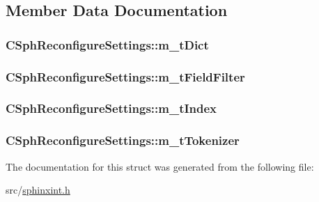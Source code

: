 \subsection{Member Data Documentation}
\hypertarget{structCSphReconfigureSettings_a40f47cd7d52afd6f313c79d8aea17ba6}{
\subsubsection[{m\-\_\-t\-Dict}]{ C\-Sph\-Reconfigure\-Settings\-::m\-\_\-t\-Dict}}\label{structCSphReconfigureSettings_a40f47cd7d52afd6f313c79d8aea17ba6}
\hypertarget{structCSphReconfigureSettings_ad9f3ec1becdaad2cc1f3a8f513bd2748}{
\subsubsection[{m\-\_\-t\-Field\-Filter}]{ C\-Sph\-Reconfigure\-Settings\-::m\-\_\-t\-Field\-Filter}}\label{structCSphReconfigureSettings_ad9f3ec1becdaad2cc1f3a8f513bd2748}
\hypertarget{structCSphReconfigureSettings_af0aff159ed802db28d7ef4397c12dd7d}{
\subsubsection[{m\-\_\-t\-Index}]{ C\-Sph\-Reconfigure\-Settings\-::m\-\_\-t\-Index}}\label{structCSphReconfigureSettings_af0aff159ed802db28d7ef4397c12dd7d}
\hypertarget{structCSphReconfigureSettings_aa868c55b1fd03543bcce7242e81982f9}{
\subsubsection[{m\-\_\-t\-Tokenizer}]{ C\-Sph\-Reconfigure\-Settings\-::m\-\_\-t\-Tokenizer}}\label{structCSphReconfigureSettings_aa868c55b1fd03543bcce7242e81982f9}


The documentation for this struct was generated from the following file\-:\begin{DoxyCompactItemize}
\item 
src/\hyperlink{sphinxint_8h}{sphinxint.\-h}\end{DoxyCompactItemize}
